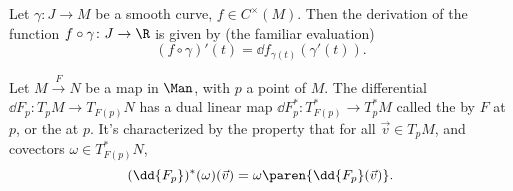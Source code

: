 \begin{prop}[]
   Let $\gamma \colon J \to M$ be a smooth curve, $f \in C^\times(M)$. Then the derivation of the function $f \circ \gamma \colon J \to \R$ is given by (the familiar evaluation)
   \[
      (f \circ \gamma) ' (t) = \dd { f_{\gamma(t)} } (\gamma'(t)).
   \]
\end{prop}

\begin{defn}
   Let $M \xrightarrow{F} N$ be a map in $\Man$, with $p$ a point of $M$. The differential $\dd { F_p } \colon T_p M \to T_{F(p)} N$ has a dual linear map $\dd { F^*_p } \colon T^*_{F(p)} \to T^*_p M$ called the  by $F$ at $p$, or the  at $p$. It's characterized by the property that for all $\vec v \in T_p M$, and covectors $\omega \in T^*_{F(p)} N$,
   \[
      (\dd { F_p })^*(\omega)(\vec v) = \omega \paren{\dd { F_p }(\vec v)}.
   \]
\end{defn}
